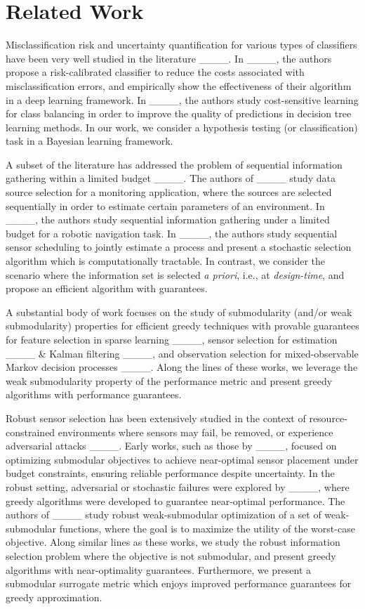 \section{Related Work}
Misclassification risk and uncertainty quantification for various types of classifiers have been very well studied in the literature ____. In ____, the authors propose a risk-calibrated classifier to reduce the costs associated with misclassification errors, and empirically show the effectiveness of their algorithm in a  deep learning framework. In ____, the authors study cost-sensitive learning for class balancing in order to improve the quality of predictions in decision tree learning methods. In our work, we consider a hypothesis testing (or classification) task in a Bayesian learning framework. 

A subset of the literature has addressed the problem of sequential information gathering within a limited budget ____. The authors of  ____ study data source selection for a monitoring application, where the sources are selected sequentially in order to estimate certain parameters of an environment. In ____, the authors study sequential information gathering under a limited budget for a robotic navigation task. In ____, the authors study sequential sensor scheduling to jointly estimate a process and present a stochastic selection algorithm which is computationally tractable.  In contrast, we consider the scenario where the information set is selected \textit{a priori}, i.e., at \textit{design-time}, and propose an efficient algorithm with guarantees. 

A substantial body of work focuses on the study of submodularity (and/or weak submodularity) properties for efficient greedy techniques with provable guarantees for feature selection in sparse learning ____, sensor selection for estimation ____ \& Kalman filtering ____, and observation selection for mixed-observable Markov decision processes ____.  Along the lines of these works, we leverage the weak submodularity property of the performance metric and present greedy algorithms with performance guarantees.

Robust sensor selection has been extensively studied in the context of resource-constrained environments where sensors may fail, be removed, or experience adversarial attacks ____. Early works, such as those by ____, focused on optimizing submodular objectives to achieve near-optimal sensor placement under budget constraints, ensuring reliable performance despite uncertainty. In the robust setting, adversarial or stochastic failures were explored by ____, where greedy algorithms were developed to guarantee near-optimal performance. The authors of ____ study robust weak-submodular optimization of a set of weak-submodular functions, where the goal is to maximize the utility of the worst-case objective. Along similar lines as these works, we study the robust information selection problem where the objective is not submodular, and present greedy algorithms with near-optimality guarantees. Furthermore, we present a submodular surrogate metric which enjoys improved performance guarantees for greedy approximation.
\newpage
